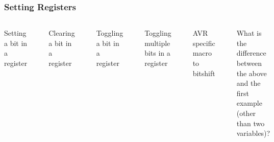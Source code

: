 \documentclass[t]{beamer}
\begin{document}
\begin{frame}[t,fragile]
\frametitle{Setting Registers}
\begin{columns}
Setting a bit in a register
\begin{verbatim}
REG = REG | (1 << x);
REG |= (1<<x);
\end{verbatim}
Clearing a bit in a register
\begin{verbatim}
REG = REG & ~(1 << x);
REG &= ~(1<<x);
\end{verbatim}
Toggling a bit in a register
\begin{verbatim}
REG = REG ^ (1 << x);
REG ^= (1<<x);
\end{verbatim}
Toggling multiple bits in a register
\begin{verbatim}
REG = REG ^ ((1 << x) | (1 << y));
REG ^= (1<<x) | (1<<y);
\end{verbatim}
AVR specific macro to bitshift
\begin{verbatim}
(1<<x) == _BV(x)
REG = (1<<x) | (1<<y);
REG = _BV(x) | _BV(y);
\end{verbatim}
What is the difference between the above and the first example (other than two variables)?
\end{columns}
\end{frame}
\end{document}
